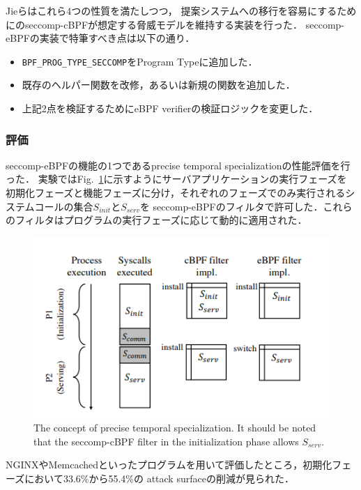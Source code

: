 \documentclass[platex,a4j,10pt,twoside,twocolumn,dvipdfmx]{jsarticle}
\newcommand{\Fref}[1]{Fig.~\ref{#1}}
\begin{document}
Jieらはこれら4つの性質を満たしつつ，
提案システムへの移行を容易にするためにのseccomp-cBPFが想定する脅威モデルを維持する実装を行った．
seccomp-eBPFの実装で特筆すべき点は以下の通り．
\begin{itemize}
  \item \texttt{BPF\_PROG\_TYPE\_SECCOMP}をProgram Typeに追加した．
  \item 既存のヘルパー関数を改修，あるいは新規の関数を追加した．
  \item 上記2点を検証するためにeBPF verifierの検証ロジックを変更した．
\end{itemize}

\subsubsection{評価}
seccomp-eBPFの機能の1つであるprecise temporal specializationの性能評価を行った．
実験では\Fref{img:tmp-spec}に示すようにサーバアプリケーションの実行フェーズを
初期化フェーズと機能フェーズに分け，それぞれのフェーズでのみ実行されるシステムコールの集合$S_{init}とS_{serv}$を
seccomp-eBPFのフィルタで許可した．これらのフィルタはプログラムの実行フェーズに応じて動的に適用された．
\begin{figure}[tp]
  \begin{center}
    \includegraphics[width=\columnwidth]{./img/tmp-spec.png}
  \end{center}
  \caption{The concept of precise temporal specialization. It should be noted that
    the seccomp-cBPF filter in the initialization phase allows $S_{serv}$.}
  \label{img:tmp-spec}
\end{figure}
NGINXやMemcachedといったプログラムを用いて評価したところ，初期化フェーズにおいて33.6\%から55.4\%の
attack surfaceの削減が見られた．
\end{document}
